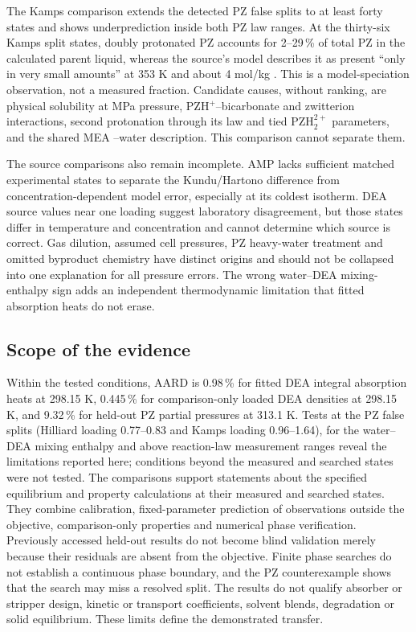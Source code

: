 The Kamps comparison extends the detected PZ false splits to at least forty states and shows underprediction inside both PZ law ranges.
At the thirty-six Kamps split states, doubly protonated PZ accounts for 2--29\,\% of total PZ in the calculated parent liquid, whereas the source's model describes it as present ``only in very small amounts'' at 353 K and about 4 mol/kg \cite[p.~2666]{kampsSolubilityCO2H2O+piperazine2003a}.
This is a model-speciation observation, not a measured fraction.
Candidate causes, without ranking, are physical \COtwo solubility at MPa pressure, PZH$^+$--bicarbonate and zwitterion interactions, second protonation through its law and tied PZH$_2^{2+}$ parameters, and the shared MEA \COtwo--water description.
This comparison cannot separate them.

The source comparisons also remain incomplete.
AMP lacks sufficient matched experimental states to separate the Kundu/Hartono difference from concentration-dependent model error, especially at its coldest isotherm.
DEA source values near one loading suggest laboratory disagreement, but those states differ in temperature and concentration and cannot determine which source is correct.
Gas dilution, assumed cell pressures, PZ heavy-water treatment and omitted byproduct chemistry have distinct origins and should not be collapsed into one explanation for all pressure errors.
The wrong water--DEA mixing-enthalpy sign adds an independent thermodynamic limitation that fitted absorption heats do not erase.

\subsection{Scope of the evidence}
Within the tested conditions, AARD is 0.98\,\% for fitted DEA integral absorption heats at 298.15 K, 0.445\,\% for comparison-only loaded DEA densities at 298.15 K, and 9.32\,\% for held-out PZ partial pressures at 313.1 K.
Tests at the PZ false splits (Hilliard loading 0.77--0.83 and Kamps loading 0.96--1.64), for the water--DEA mixing enthalpy and above reaction-law measurement ranges reveal the limitations reported here; conditions beyond the measured and searched states were not tested.
The comparisons support statements about the specified equilibrium and property calculations at their measured and searched states.
They combine calibration, fixed-parameter prediction of observations outside the objective, comparison-only properties and numerical phase verification.
Previously accessed held-out results do not become blind validation merely because their residuals are absent from the objective.
Finite phase searches do not establish a continuous phase boundary, and the PZ counterexample shows that the search may miss a resolved split.
The results do not qualify absorber or stripper design, kinetic or transport coefficients, solvent blends, degradation or solid equilibrium.
These limits define the demonstrated transfer.
